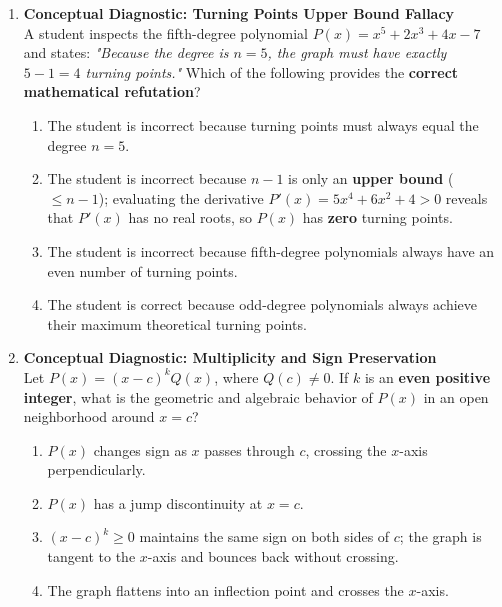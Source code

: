 \begin{enumerate}[resume]
\item \textbf{Conceptual Diagnostic: Turning Points Upper Bound Fallacy} \\
A student inspects the fifth-degree polynomial $P(x) = x^5 + 2x^3 + 4x - 7$ and states: \textit{"Because the degree is $n = 5$, the graph must have exactly $5 - 1 = 4$ turning points."} Which of the following provides the \textbf{correct mathematical refutation}?
\begin{enumerate}
    \item The student is incorrect because turning points must always equal the degree $n = 5$.
    \item The student is incorrect because $n - 1$ is only an \textbf{upper bound} ($\le n - 1$); evaluating the derivative $P'(x) = 5x^4 + 6x^2 + 4 > 0$ reveals that $P'(x)$ has no real roots, so $P(x)$ has \textbf{zero} turning points.
    \item The student is incorrect because fifth-degree polynomials always have an even number of turning points.
    \item The student is correct because odd-degree polynomials always achieve their maximum theoretical turning points.
\end{enumerate}

\item \textbf{Conceptual Diagnostic: Multiplicity and Sign Preservation} \\
Let $P(x) = (x - c)^k Q(x)$, where $Q(c) \neq 0$. If $k$ is an \textbf{even positive integer}, what is the geometric and algebraic behavior of $P(x)$ in an open neighborhood around $x = c$?
\begin{enumerate}
    \item $P(x)$ changes sign as $x$ passes through $c$, crossing the $x$-axis perpendicularly.
    \item $P(x)$ has a jump discontinuity at $x = c$.
    \item $(x - c)^k \ge 0$ maintains the same sign on both sides of $c$; the graph is tangent to the $x$-axis and bounces back without crossing.
    \item The graph flattens into an inflection point and crosses the $x$-axis.
\end{enumerate}
\end{enumerate}